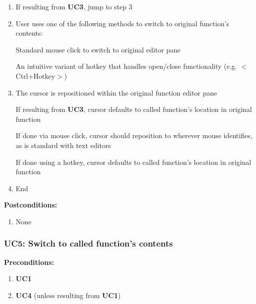 \documentclass[]{report}
\begin{document}
		\begin{enumerate}
			
			\item 
			If resulting from \textbf{UC3}, jump to step 3
			
			\item
			User uses one of the following methods to switch to original function's contents:
			
				\subitem
				Standard mouse click to switch to original editor pane
				
				\subitem
				An intuitive variant of hotkey that handles open/close functionality (e.g. $<$Ctrl+Hotkey$>$)
			
			\item 
			The cursor is repositioned within the original function editor pane
			
				\subitem
				If resulting from \textbf{UC3}, cursor defaults to called function's location in original function
			
				\subitem
				If done via mouse click, cursor should reposition to wherever mouse identifies, as is standard with text editors
				
				\subitem
				If done using a hotkey, cursor defaults to called function's location in original function
			
			\item
			End
		\end{enumerate}
		
		\noindent\textbf{Postconditions:}
		
		\begin{enumerate}
			
			\item 
			None
			
		\end{enumerate}
		
		\vspace{0.25in}
		
		\subsubsection{UC5:  Switch to called function's contents}
		
		\textbf{Preconditions:}
		
		\begin{enumerate}
			
			\item \textbf{UC1}
			
			\item \textbf{UC4} (unless resulting from \textbf{UC1})
			
		\end{enumerate}
		
\end{document}
